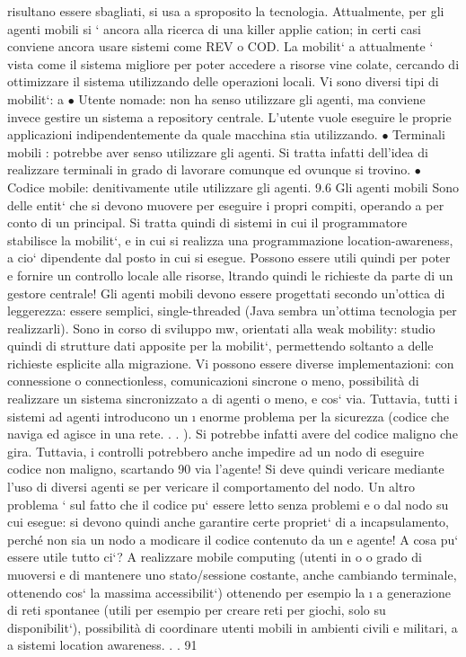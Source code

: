 \documentclass[a4paper,12pt]{article}
\begin{document}
risultano essere sbagliati, si usa a sproposito la tecnologia.
Attualmente, per gli agenti mobili si ` ancora alla ricerca di una killer applie
cation; in certi casi conviene ancora usare sistemi come REV o COD. La mobilit`
a
attualmente ` vista come il sistema migliore per poter accedere a risorse vine
colate, cercando di ottimizzare il sistema utilizzando delle operazioni locali. Vi
sono diversi tipi di mobilit`:
a
$\bullet$ Utente nomade: non ha senso utilizzare gli agenti, ma conviene invece
gestire un sistema a repository centrale. L'utente vuole eseguire le proprie
applicazioni indipendentemente da quale macchina stia utilizzando.
$\bullet$ Terminali mobili : potrebbe aver senso utilizzare gli agenti. Si tratta infatti
dell'idea di realizzare terminali in grado di lavorare comunque ed ovunque
si trovino.
$\bullet$ Codice mobile: denitivamente utile utilizzare gli agenti.
9.6
Gli agenti mobili
Sono delle entit` che si devono muovere per eseguire i propri compiti, operando
a
per conto di un principal. Si tratta quindi di sistemi in cui il programmatore stabilisce la mobilit`, e in cui si
realizza una programmazione location-awareness,
a
cio` dipendente dal posto in cui si esegue. Possono essere utili quindi per poter
e
fornire un controllo locale alle risorse, ltrando quindi le richieste da parte di un
gestore centrale! Gli agenti mobili devono essere progettati secondo un'ottica di
leggerezza: essere semplici, single-threaded (Java sembra un'ottima tecnologia
per realizzarli). Sono in corso di sviluppo mw, orientati alla weak mobility:
studio quindi di strutture dati apposite per la mobilit`, permettendo soltanto
a
delle richieste esplicite alla migrazione.
Vi possono essere diverse implementazioni: con connessione o connectionless,
comunicazioni sincrone o meno, possibilità di realizzare un sistema sincronizzato
a
di agenti o meno, e cos` via. Tuttavia, tutti i sistemi ad agenti introducono un
\i{}
enorme problema per la sicurezza (codice che naviga ed agisce in una rete. . . ). Si
potrebbe infatti avere del codice maligno che gira. Tuttavia, i controlli potrebbero anche impedire ad un nodo di
eseguire codice non maligno, scartando
90
\newpage
via l'agente! Si deve quindi vericare mediante l'uso di diversi agenti se per
vericare il comportamento del nodo.
Un altro problema ` sul fatto che il codice pu` essere letto senza problemi
e
o
dal nodo su cui esegue: si devono quindi anche garantire certe propriet` di
a
incapsulamento, perché non sia un nodo a modicare il codice contenuto da un
e
agente!
A cosa pu` essere utile tutto ci`? A realizzare mobile computing (utenti in
o
o
grado di muoversi e di mantenere uno stato/sessione costante, anche cambiando
terminale, ottenendo cos` la massima accessibilit`) ottenendo per esempio la
\i{}
a
generazione di reti spontanee (utili per esempio per creare reti per giochi, solo su
disponibilit`), possibilità di coordinare utenti mobili in ambienti civili e militari,
a
a
sistemi location awareness. . .
91
\newpage
\end{document}
